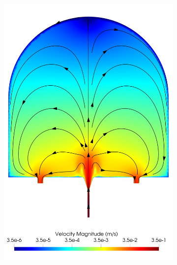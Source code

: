     \begin{figure}
        \centering
        \begin{subfigure}[b]{0.45\textwidth}
            \centering
            \includegraphics[width=\textwidth]{diagrams/results-modelling/velocity-transport/meshandsoln_dg_velocity_placentone_nsb_velocity-log.png}
            \caption{}
        \end{subfigure}
        \hfill
        \begin{subfigure}[b]{0.45\textwidth}
            \centering

\end{subfigure}
\end{figure}
